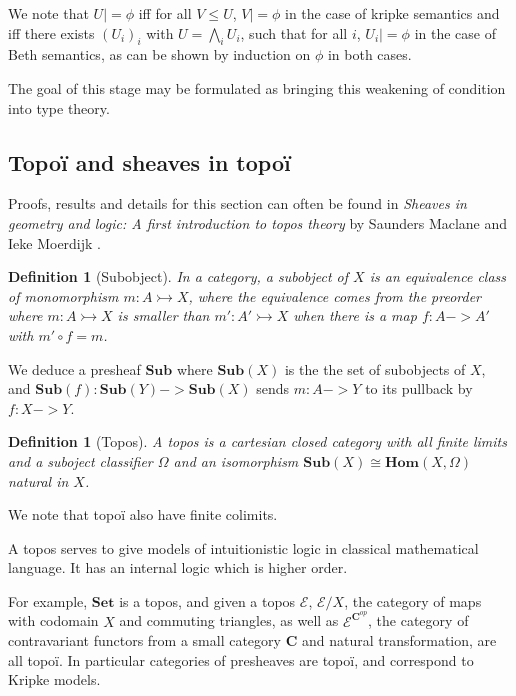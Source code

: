 \documentclass[11pt]{article}
\newtheorem{definition}[theorem]{Definition}
\newcommand{\0}{\mathbf{0}}
\newcommand{\1}{\mathbf{1}}
\newcommand{\mono}{\rightarrowtail}
\begin{document}
We note that $U |= \phi$ iff for all $V\leq U$, $V |= \phi$ in the case of kripke semantics and iff there exists $(U_i)_i$ with $U = \bigwedge_i U_i$, such that for all $i$, $U_i |= \phi$ in the case of Beth semantics, as can be shown by induction on $\phi$ in both cases.

The goal of this stage may be formulated as bringing this weakening of condition into type theory.

\subsection{Topoï and sheaves in topoï}


Proofs, results and details for this section can often be found in \emph{Sheaves in geometry and logic: A first introduction to topos theory} by Saunders Maclane and Ieke Moerdijk \cite{maclane2012sheaves}.

\begin{definition}[Subobject]
    In a category, a \emph{subobject} of $X$ is an equivalence class of monomorphism $m : A \mono X$, where the equivalence comes from the preorder where $ m : A \mono X $ is smaller than $ m' : A' \mono X$ when there is a map $f : A -> A'$ with $ m' \circ f = m$.
\end{definition}

We deduce a presheaf $\mathbf{Sub}$ where $\mathbf{Sub}(X)$ is the the set of subobjects of $X$, and $\mathbf{Sub}(f) : \mathbf{Sub}(Y) -> \mathbf{Sub}(X)$ sends $m : A -> Y$ to its pullback by $f : X -> Y $. 

\begin{definition}[Topos]\label{topos}
    A \emph{topos} is a cartesian closed category with all finite limits and a suboject \emph{classifier} $\Omega$ and an isomorphism $\mathbf{Sub}(X)\cong \mathbf{Hom}(X, \Omega)$ natural in $X$.
\end{definition}

We note that topoï also have finite colimits.

A topos serves to give models of intuitionistic logic in classical mathematical language. It has an internal logic which is higher order.

For example, $\mathbf{Set}$ is a topos, and given a topos $\mathcal E$, $\mathcal{E}/X$, the category of maps with codomain $X$ and commuting triangles, as well as $\mathcal{E}^{\mathbf{C}^{op}}$, the category of contravariant functors from a small category $\mathbf{C}$ and natural transformation, are all topoï. In particular categories of presheaves are topoï, and correspond to Kripke models. 
\end{document}
